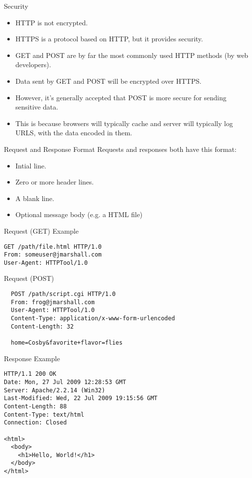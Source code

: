 \begin{frame}{Security}
  \begin{itemize}
    \item HTTP is not encrypted.
    \item HTTPS is a protocol based on HTTP, but it provides security.
    \item GET and POST are by far the most commonly used HTTP methods (by web developers).
    \item Data sent by GET and POST will be encrypted over HTTPS.
    \item However, it's generally accepted that POST is more secure for sending sensitive data.
    \item This is because browsers will typically cache and server will typically log URLS, with the data encoded in them.
  \end{itemize}
\end{frame}

\begin{frame}[fragile]{Request and Response Format}
  Requests and responses both have this format:
  \begin{itemize}
    \item Intial line.
    \item Zero or more header lines.
    \item A blank line.
    \item Optional message body (e.g. a HTML file)
  \end{itemize}
\end{frame}


\begin{frame}[fragile]{Request (GET) Example}
  \begin{verbatim}
GET /path/file.html HTTP/1.0
From: someuser@jmarshall.com
User-Agent: HTTPTool/1.0
  \end{verbatim}
\end{frame}

\begin{frame}[fragile]{Request (POST)}
  \begin{verbatim}
  POST /path/script.cgi HTTP/1.0
  From: frog@jmarshall.com
  User-Agent: HTTPTool/1.0
  Content-Type: application/x-www-form-urlencoded
  Content-Length: 32
  
  home=Cosby&favorite+flavor=flies
  \end{verbatim}
\end{frame}

\begin{frame}[fragile]{Response Example}
  \begin{verbatim}
HTTP/1.1 200 OK
Date: Mon, 27 Jul 2009 12:28:53 GMT
Server: Apache/2.2.14 (Win32)
Last-Modified: Wed, 22 Jul 2009 19:15:56 GMT
Content-Length: 88
Content-Type: text/html
Connection: Closed

<html>
  <body>
    <h1>Hello, World!</h1>
  </body>
</html>
  \end{verbatim}
\end{frame}



